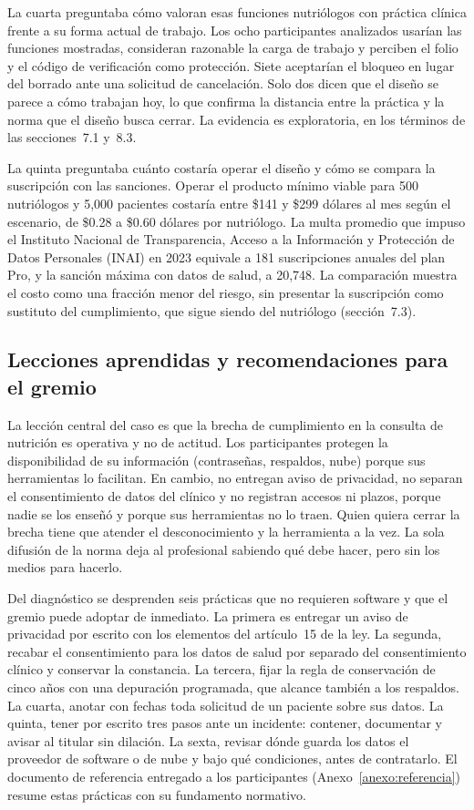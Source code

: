 \documentclass[12pt, a4paper]{article}
\begin{document}
La cuarta preguntaba cómo valoran esas funciones nutriólogos con
práctica clínica frente a su forma actual de trabajo. Los ocho
participantes analizados usarían las funciones mostradas, consideran
razonable la carga de trabajo y perciben el folio y el código de verificación
como protección. Siete aceptarían el bloqueo en lugar del borrado ante
una solicitud de cancelación. Solo dos dicen que el diseño se parece a
cómo trabajan hoy, lo que confirma la distancia entre la práctica y la
norma que el diseño busca cerrar. La evidencia es exploratoria, en los
términos de las secciones~7.1 y~8.3.

La quinta preguntaba cuánto costaría operar el diseño y cómo se compara
la suscripción con las sanciones. Operar el producto mínimo viable para
500 nutriólogos y 5,000 pacientes costaría entre \$141 y \$299 dólares
al mes según el escenario, de \$0.28 a \$0.60 dólares por nutriólogo. La
multa promedio que impuso el Instituto Nacional de Transparencia, Acceso a la Información y Protección de Datos Personales (INAI) en 2023 equivale a 181 suscripciones
anuales del plan Pro, y la sanción máxima con datos de salud, a 20,748.
La comparación muestra el costo como una fracción menor del riesgo, sin
presentar la suscripción como sustituto del cumplimiento, que sigue
siendo del nutriólogo (sección~7.3).

\subsection{Lecciones aprendidas y recomendaciones para el gremio}
La lección central del caso es que la brecha de cumplimiento en la
consulta de nutrición es operativa y no de actitud. Los participantes
protegen la disponibilidad de su información (contraseñas, respaldos,
nube) porque sus herramientas lo facilitan. En cambio, no entregan aviso
de privacidad, no separan el consentimiento de datos del clínico y no
registran accesos ni plazos, porque nadie se los enseñó y porque sus
herramientas no lo traen. Quien quiera cerrar la brecha tiene que
atender el desconocimiento y la herramienta a la vez. La sola difusión
de la norma deja al profesional sabiendo qué debe hacer, pero sin los
medios para hacerlo.

Del diagnóstico se desprenden seis prácticas que no requieren software y
que el gremio puede adoptar de inmediato. La primera es entregar un
aviso de privacidad por escrito con los elementos del artículo~15 de la
ley. La segunda, recabar el consentimiento para los datos de salud por
separado del consentimiento clínico y conservar la constancia. La
tercera, fijar la regla de conservación de cinco años con una depuración
programada, que alcance también a los respaldos. La cuarta, anotar con
fechas toda solicitud de un paciente sobre sus datos. La quinta, tener
por escrito tres pasos ante un incidente: contener, documentar y avisar
al titular sin dilación. La sexta, revisar dónde guarda los datos el
proveedor de software o de nube y bajo qué condiciones, antes de
contratarlo. El documento de referencia entregado a los participantes
(Anexo~\ref{anexo:referencia}) resume estas prácticas con su fundamento
normativo.
\end{document}
